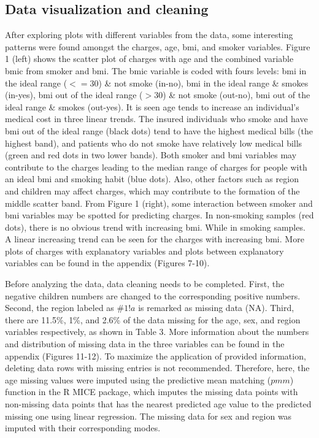\documentclass[12pt]{article}
\begin{document}
\subsection{Data visualization and cleaning }
After exploring plots with different variables from the data, some interesting patterns were found amongst the charges, age, bmi, and smoker variables. Figure 1 (left) shows the scatter plot of charges with age and the combined variable bmic from smoker and bmi. The bmic variable is coded with fours levels: bmi in the ideal range ($<=30$) \& not smoke (in-no), bmi in the ideal range \& smokes (in-yes), bmi out of the ideal range ($>30$) \& not smoke (out-no), bmi out of the ideal range \& smokes (out-yes). It is seen age tends to increase an individual's medical cost in three linear trends. The insured individuals who smoke and have bmi out of the ideal range (black dots) tend to have the highest medical bills (the highest band), and patients who do not smoke have relatively low medical bills (green and red dots in two lower bands). Both smoker and bmi variables may contribute to the charges leading to the median range of charges for people with an ideal bmi and smoking habit (blue dots). Also, other factors such as region and children may affect charges, which may contribute to the formation of the middle scatter band. From Figure 1 (right), some interaction between smoker and bmi variables may be spotted for predicting charges. In non-smoking samples (red dots), there is no obvious trend with increasing bmi. While in smoking samples. A linear increasing trend can be seen for the charges with increasing bmi. More plots of charges with explanatory variables and plots between explanatory variables can be found in the appendix (Figures 7-10).
\medskip

Before analyzing the data, data cleaning needs to be completed. First, the negative children numbers are changed to the corresponding positive numbers. Second, the region labeled as $\#1!a$ is remarked as missing data (NA). Third, there are 11.5\%, 1\%, and 2.6\% of the data missing for the age, sex, and region variables respectively, as shown in Table 3. More information about the numbers and distribution of missing data in the three variables can be found in the appendix (Figures 11-12). To maximize the application of provided information, deleting data rows with missing entries is not recommended. Therefore, here, the age missing values were imputed using the predictive mean matching ($pmm$) function in the R MICE package, which imputes the missing data points with non-missing data points that has the nearest predicted age value to the predicted missing one using linear regression. The missing data for sex and region was imputed with their corresponding modes.
\end{document}
